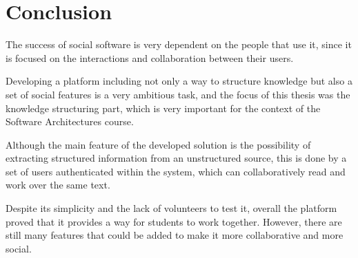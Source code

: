 
\chapter{Conclusion}
\label{chapter:conclusion}

The success of social software is very dependent on the people that use it, since it is focused on the interactions and collaboration between their users.

Developing a platform including not only a way to structure knowledge but also a set of social features is a very ambitious task, and the focus of this thesis was the knowledge structuring part, which is very important for the context of the Software Architectures course.

Although the main feature of the developed solution is the possibility of extracting structured information from an unstructured source, this is done by a set of users authenticated within the system, which can collaboratively read and work over the same text.

Despite its simplicity and the lack of volunteers to test it, overall the platform proved that it provides a way for students to work together. However, there are still many features that could be added to make it more collaborative and more social.





